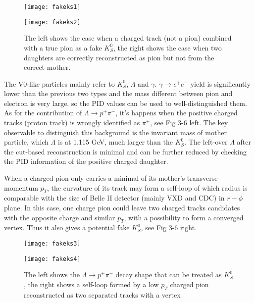 \begin{figure}[htpb]
	\begin{minipage}[t]{0.5\linewidth} %
		\centering 
		\texttt{[image: fakeks1]} 
		\label{fig:side:a} 
	\end{minipage}%
	\begin{minipage}[t]{0.5\linewidth} 
		\centering 
		\texttt{[image: fakeks2]} 
		\label{fig:side:b} 
	\end{minipage}%
	
	\caption{The left shows the case when a charged track (not a pion) combined with a true pion as a fake $K_S^0$, the right shows the case when two daughters are correctly reconstructed as pion but not from the correct mother. }
\end{figure}

The V0-like particles mainly refer to $K_S^0$, $\Lambda$ and $\gamma$. $\gamma \to e^+ e^-$ yield is significantly lower than the previous two types and the mass different between pion and electron is very large, so the PID values can be used to well-distinguished them. As for the contribution of $\Lambda \to p^+ \pi^-$, it's happens when the positive charged tracks (proton track) is wrongly identified as $\pi^+$, see Fig 3-6 left. The key observable to distinguish this background is the invariant mass of mother particle, which $\Lambda$ is at 1.115 GeV, much larger than the $K_S^0$. The left-over $\Lambda$ after the cut-based reconstruction is minimal and can be further reduced by checking the PID information of the positive charged daughter. 

When a charged pion only carries a minimal of its mother's transverse momentum $p_T$, the curvature of its track may form a self-loop of which radius is comparable with the size of Belle II detector (mainly VXD and CDC) in $r-\phi$ plane. In this case, one charge pion could leave two charged tracks candidates with the opposite charge and similar $p_T$, with a possibility to form a converged vertex. Thus it also gives a potential fake $K_S^0$, see Fig 3-6 right.

\begin{figure}[htbp]
	\begin{minipage}[t]{0.5\linewidth} %
		\centering 
		\texttt{[image: fakeks3]} 
		\label{fig:side:a} 
	\end{minipage}%
	\begin{minipage}[t]{0.5\linewidth} 
		\centering 
		\texttt{[image: fakeks4]} 
		\label{fig:side:b} 
	\end{minipage}%
	
	\caption{The left shows the $\Lambda \to p^+ \pi^-$ decay shape that can be treated as $K_S^0$, the right shows a self-loop formed by a low $p_T$ charged pion reconstructed as two separated tracks with a vertex}
\end{figure}

